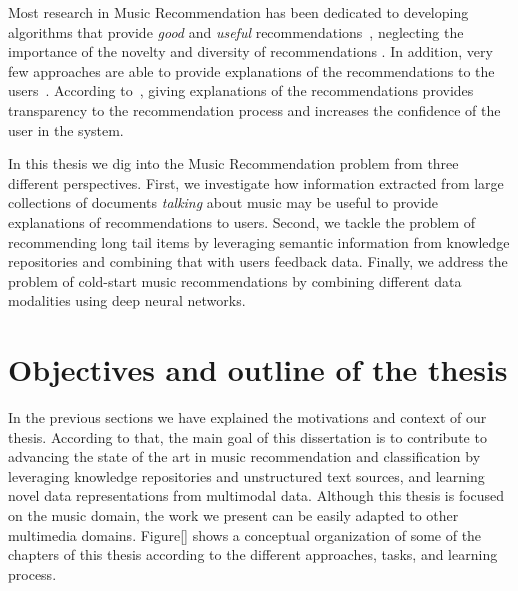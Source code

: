 Most research in Music Recommendation has been dedicated to developing algorithms that provide \textit{good} and \textit{useful} recommendations~\citep{oscarBook}, neglecting the importance of the novelty and diversity of recommendations \citep{adomavicius2012improving,Bellogin2010}. In addition, very few approaches are able to provide explanations of the recommendations to the users~\citep{Passant2008, Passant2010}. According to~\cite{celma2008new}, giving explanations of the recommendations provides transparency to the recommendation process and increases the confidence of the user in the system.

In this thesis we dig into the Music Recommendation problem from three different perspectives. First, we investigate how information extracted from large collections of documents \textit{talking} about music may be useful to provide explanations of recommendations to users. Second, we tackle the problem of recommending long tail items by leveraging semantic information from knowledge repositories and combining that with users feedback data. Finally, we address the problem of cold-start music recommendations by combining different data modalities using deep neural networks.


\section{Objectives and outline of the thesis}
\label{sec:intro:objectives}

In the previous sections we have explained the motivations and context of our thesis. According to that, the main goal of this dissertation is to contribute to advancing the state of the art in music recommendation and classification by leveraging knowledge repositories and unstructured text sources, and learning novel data representations from multimodal data. Although this thesis is focused on the music domain, the work we present can be easily adapted to other multimedia domains. Figure\ref{} shows a conceptual organization of some of the chapters of this thesis according to the different approaches, tasks, and learning process.

